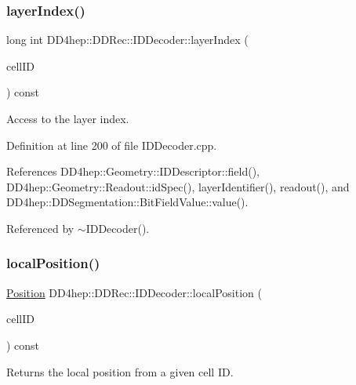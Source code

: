 \subsubsection{\texorpdfstring{layer\+Index()}{layerIndex()}}
{\footnotesize\ttfamily long int D\+D4hep\+::\+D\+D\+Rec\+::\+I\+D\+Decoder\+::layer\+Index (\begin{DoxyParamCaption}\item[{const \hyperlink{namespace_d_d4hep_1_1_d_d_rec_af5cecc2e566eeaedb430b92df23971d4}{Cell\+ID} \&}]{cell\+ID }\end{DoxyParamCaption}) const}



Access to the layer index. 



Definition at line 200 of file I\+D\+Decoder.\+cpp.



References D\+D4hep\+::\+Geometry\+::\+I\+D\+Descriptor\+::field(), D\+D4hep\+::\+Geometry\+::\+Readout\+::id\+Spec(), layer\+Identifier(), readout(), and D\+D4hep\+::\+D\+D\+Segmentation\+::\+Bit\+Field\+Value\+::value().



Referenced by $\sim$\+I\+D\+Decoder().

\hypertarget{class_d_d4hep_1_1_d_d_rec_1_1_i_d_decoder_a047e575f6ac1fc4d7b443dbe4347816c}{}\label{class_d_d4hep_1_1_d_d_rec_1_1_i_d_decoder_a047e575f6ac1fc4d7b443dbe4347816c} 
\subsubsection{\texorpdfstring{local\+Position()}{localPosition()}}
{\footnotesize\ttfamily \hyperlink{namespace_d_d4hep_1_1_geometry_a55083902099d03506c6db01b80404900}{Position} D\+D4hep\+::\+D\+D\+Rec\+::\+I\+D\+Decoder\+::local\+Position (\begin{DoxyParamCaption}\item[{const \hyperlink{namespace_d_d4hep_1_1_d_d_rec_af5cecc2e566eeaedb430b92df23971d4}{Cell\+ID} \&}]{cell\+ID }\end{DoxyParamCaption}) const}



Returns the local position from a given cell ID. 



